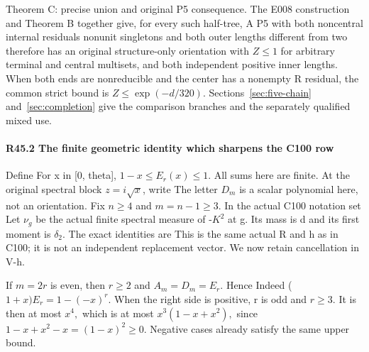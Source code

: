 Theorem C: precise union and original P5 consequence. The
E008 construction and Theorem B together give, for every such half-tree,
 A P5 with both noncentral internal residuals
nonunit singletons and both outer lengths different from two therefore
has an original structure-only orientation with \(Z\le 1\) for arbitrary
terminal and central multisets, and both independent positive inner
lengths. When both ends are nonreducible and the center has a nonempty
R residual, the common strict bound is \(Z\le \exp(-d/320).\) Sections~\ref{sec:five-chain} and~\ref{sec:completion} give
the comparison branches and the separately qualified mixed use.

\paragraph{R45.2 The finite geometric identity which sharpens the C100 row}

Define
For x in [0, theta], \(1-x\le E_r(x)\le 1.\) All sums here are finite.
At the original spectral block \(z=i \sqrt{x}\), write
The letter \(D_m\) is a scalar polynomial here, not an orientation. Fix
\(n\ge 4\) and \(m=n-1\ge 3.\) In the actual C100 notation set
Let \(\nu_g\) be the actual finite spectral measure of -\(K^2\) at g. Its mass
is d and its first moment is \(\delta_2.\) The exact identities are
This is the same actual R and h as in C100; it is not an independent
replacement vector. We now retain cancellation in V-h.

If \(m=2r\) is even, then \(r\ge 2\) and \(A_m=D_m=E_r.\) Hence
Indeed (\(1+x)E_r=1-(-x)^r.\) When the right side is positive, r is odd
and \(r\ge 3.\) It is then at most \(x^4,\allowbreak \) which is at most
\(x^3(1-x+x^2),\allowbreak \) since \(1-x+x^2-x=(1-x)^2\ge 0.\) Negative cases already
satisfy the same upper bound.

